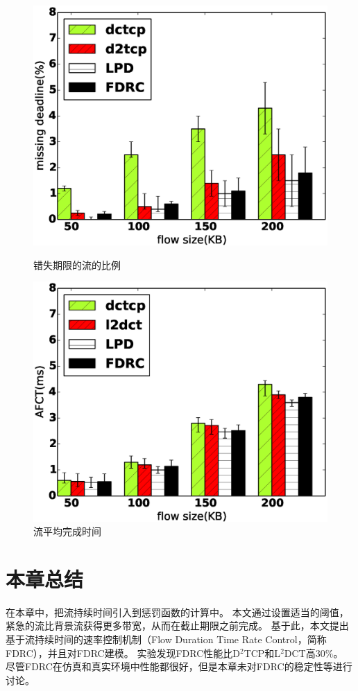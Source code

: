 \begin{figure}
\begin{minipage}{0.5\textwidth}
  \centering
  \includegraphics[width=0.7\columnwidth]{figures/FDRC/evaluation/Realtest/miss_deadline_.eps}
  \caption{错失期限的流的比例}
  \label{fdrc-qmin-fig}
\end{minipage}
\begin{minipage}{0.5\textwidth}
  \centering
  \includegraphics[width=0.7\columnwidth]{figures/FDRC/evaluation/Realtest/fct_.eps}
  \caption{流平均完成时间}
  \label{fdrc-fct-fig}
\end{minipage}
\end{figure}

\section{本章总结}

在本章中，把流持续时间引入到惩罚函数的计算中。
本文通过设置适当的阈值，紧急的流比背景流获得更多带宽，从而在截止期限之前完成。
基于此，本文提出基于流持续时间的速率控制机制（Flow Duration Time Rate Control，简称FDRC），并且对FDRC建模。
实验发现FDRC性能比D$^2$TCP和L$^2$DCT高30$\%$。
尽管FDRC在仿真和真实环境中性能都很好，但是本章未对FDRC的稳定性等进行讨论。






